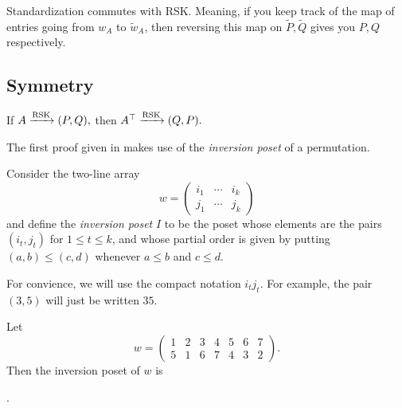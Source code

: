 \documentclass{article}
\DeclareMathOperator{\RSK}{RSK}
\newcommand{\rskarrow}{\ensuremath\xrightarrow{\RSK}}
\begin{document}
\begin{lemma}
    Standardization commutes with RSK.
    Meaning, if you keep track of the map of entries going from $w_A$ to $\widetilde{w}_A$, then reversing this map on $\widetilde{P},\widetilde{Q}$ gives you $P,Q$ respectively.
\end{lemma}

\subsection{Symmetry}

\begin{theorem}\label{thm:rsksymmetry}
    If $A \rskarrow (P,Q),$ then $A^\top \rskarrow (Q,P).$
\end{theorem}

The first proof given in \cite{StanleyEC2} makes use of the \textit{inversion poset} of a permutation.

\begin{definition}
    Consider the two-line array
    \[
        w = \begin{pmatrix}
            i_1 & \cdots & i_k \\
            j_1 & \cdots & j_k
        \end{pmatrix}
    \]
    and define the \textit{inversion poset} $I$ to be the poset whose elements are the pairs $(i_t, j_t)$ for $1 \leq t \leq k$, and whose partial order is given by putting $(a,b) \leq (c,d)$ whenever $a \leq b$ and $c \leq d$.
\end{definition}

For convience, we will use the compact notation $i_tj_t$.
For example, the pair $(3,5)$ will just be written $35$.

\begin{example}\label{ex:invposet}
    Let
    \[
        w = \begin{pmatrix}
            1 & 2 & 3 & 4 & 5 & 6 & 7 \\
            5 & 1 & 6 & 7 & 4 & 3 & 2
        \end{pmatrix}.
    \]
    Then the inversion poset of $w$ is 
    \begin{center}
        .
    \end{center}
\end{example}
\end{document}
